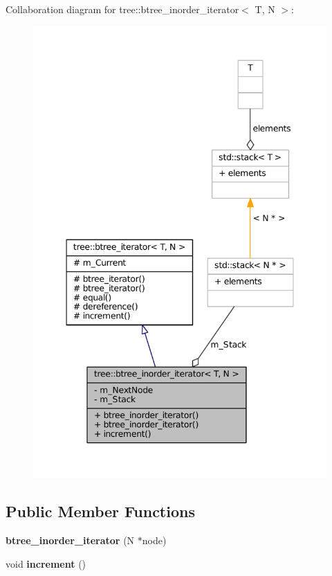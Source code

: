 \-Collaboration diagram for tree\-:\-:btree\-\_\-inorder\-\_\-iterator$<$ \-T, \-N $>$\-:
\nopagebreak
\begin{figure}[H]
\begin{center}
\leavevmode
\includegraphics[width=347pt]{classtree_1_1btree__inorder__iterator__coll__graph}
\end{center}
\end{figure}
\subsection*{\-Public \-Member \-Functions}
\begin{DoxyCompactItemize}
\item 
\hypertarget{classtree_1_1btree__inorder__iterator_abb3121aadd921041e0af5a28d527eaf2}{{\bfseries btree\-\_\-inorder\-\_\-iterator} (\-N $\ast$node)}\label{classtree_1_1btree__inorder__iterator_abb3121aadd921041e0af5a28d527eaf2}

\item 
\hypertarget{classtree_1_1btree__inorder__iterator_ae42f42822641ec3d55e2e570f9e0d897}{void {\bfseries increment} ()}\label{classtree_1_1btree__inorder__iterator_ae42f42822641ec3d55e2e570f9e0d897}

\end{DoxyCompactItemize}
